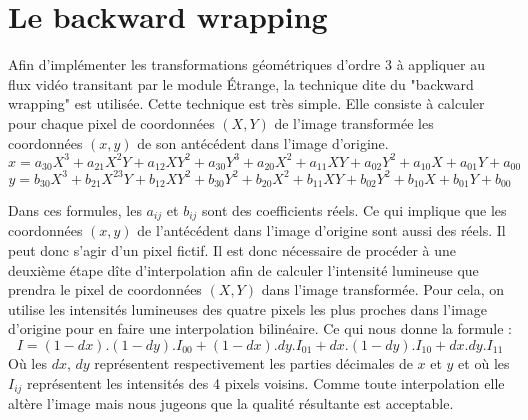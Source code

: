 \documentclass[a4paper,12pt]{report}
\begin{document}
  \newpage

  \section{Le backward wrapping}

{Afin d'implémenter les transformations géométriques d'ordre 3 à appliquer au flux vidéo transitant par le module Étrange, la technique dite du "backward wrapping" est utilisée. Cette technique est très simple. Elle consiste à calculer pour chaque pixel de coordonnées $(X,Y)$ de l'image transformée les coordonnées $(x,y)$ de son antécédent dans l'image d'origine.
	 \newline
	 $$
	 x = a_{30}X^3 + a_{21}X^2Y + a_{12}XY^2 + a_{30}Y^3
	 + a_{20}X^2 + a_{11}XY  + a_{02}Y^2
	 + a_{10}X  + a_{01}Y
	 + a_{00}
  $$
	 $$
	 y = b_{30}X^3 + b_{21}X^23Y + b_{12}XY^2 + b_{30}Y^2
	 + b_{20}X^2 + b_{11}XY  + b_{02}Y^2
	 + b_{10}X  + b_{01}Y
	 + b_{00}
  $$

  {Dans ces formules, les $a_{ij}$ et $b_{ij}$ sont des coefficients réels. Ce qui implique que les coordonnées $(x,y)$ de l'antécédent dans l'image d'origine sont aussi des réels. Il peut donc s'agir d'un pixel fictif.
	 Il est donc nécessaire de procéder à une deuxième étape dîte d'interpolation afin de calculer l'intensité lumineuse que prendra le pixel de coordonnées $(X,Y)$ dans l'image transformée. Pour cela, on utilise les intensités lumineuses des quatre pixels les plus proches dans l'image d'origine pour en faire une interpolation bilinéaire. Ce qui nous donne la formule :
		\newline
		$$
		I = (1-dx).(1-dy).I_{00} + (1-dx).dy.I_{01} + dx.(1-dy).I_{10} + dx.dy.I_{11}
	 $$
		\newline
		Où les $dx$, $dy$ représentent respectivement les parties décimales de $x$ et $y$ et où les $I_{ij}$ représentent les intensités des 4 pixels voisins. Comme toute interpolation elle altère l'image mais nous jugeons que la qualité résultante est acceptable.
  }
}
\end{document}
